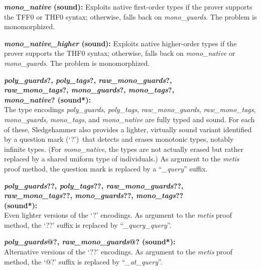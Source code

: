 \documentclass[a4paper,12pt]{article}
\begin{document}
\begin{enum}
\begin{enum}
\item[\labelitemi] \textbf{\textit{mono\_native} (sound):} Exploits native
first-order types if the prover supports the TFF0 or THF0 syntax; otherwise,
falls back on \textit{mono\_guards}. The problem is monomorphized.

\item[\labelitemi] \textbf{\textit{mono\_native\_higher} (sound):} Exploits
native higher-order types if the prover supports the THF0 syntax; otherwise,
falls back on \textit{mono\_native} or \textit{mono\_guards}. The problem is
monomorphized.

\item[\labelitemi]
\textbf{%
\textit{poly\_guards}?, \textit{poly\_tags}?, \textit{raw\_mono\_guards}?, \\
\textit{raw\_mono\_tags}?, \textit{mono\_guards}?, \textit{mono\_tags}?, \\
\textit{mono\_native}? (sound*):} \\
The type encodings \textit{poly\_guards}, \textit{poly\_tags},
\textit{raw\_mono\_guards}, \textit{raw\_mono\_tags}, \textit{mono\_guards},
\textit{mono\_tags}, and \textit{mono\_native} are fully
typed and sound. For each of these, Sledgehammer also provides a lighter,
virtually sound variant identified by a question mark (`\hbox{?}')\ that detects
and erases monotonic types, notably infinite types. (For \textit{mono\_native},
the types are not actually erased but rather replaced by a shared uniform type
of individuals.) As argument to the \textit{metis} proof method, the question
mark is replaced by a \hbox{``\textit{\_query\/}''} suffix.

\item[\labelitemi]
\textbf{%
\textit{poly\_guards}??, \textit{poly\_tags}??, \textit{raw\_mono\_guards}??, \\
\textit{raw\_mono\_tags}??, \textit{mono\_guards}??, \textit{mono\_tags}?? \\
(sound*):} \\
Even lighter versions of the `\hbox{?}' encodings. As argument to the
\textit{metis} proof method, the `\hbox{??}' suffix is replaced by
\hbox{``\textit{\_query\_query\/}''}.

\item[\labelitemi]
\textbf{%
\textit{poly\_guards}@?, \textit{raw\_mono\_guards}@? (sound*):} \\
Alternative versions of the `\hbox{??}' encodings. As argument to the
\textit{metis} proof method, the `\hbox{@?}' suffix is replaced by
\hbox{``\textit{\_at\_query\/}''}.


\end{enum}
\end{enum}
\end{document}
